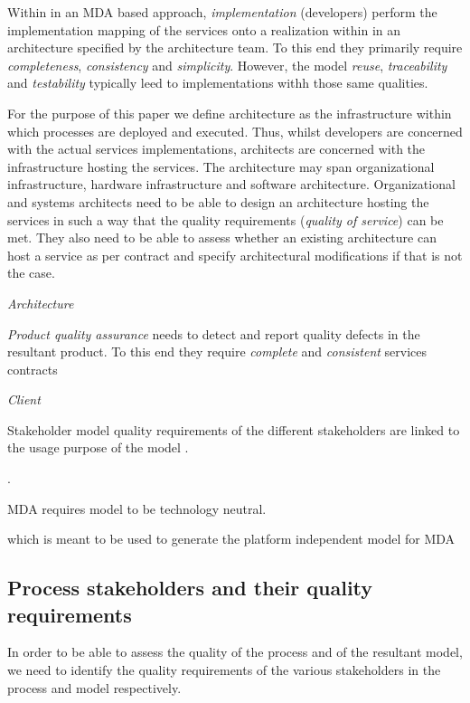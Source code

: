 Within in an MDA based approach, \emph{implementation} (developers) perform the implementation mapping of the services onto a realization within in an architecture specified by the architecture team. To this end they primarily require \emph{completeness}, \emph{consistency} and \emph{simplicity}. However, the  model \emph{reuse}, \emph{traceability} and \emph{testability} typically leed to implementations withh those same qualities.

For the purpose of this paper we define architecture as the infrastructure within which processes are deployed and executed. Thus, whilst developers are concerned with the actual services implementations, architects are concerned with the infrastructure hosting the services. The architecture may span organizational infrastructure, hardware infrastructure and software architecture. Organizational and systems architects need to be able to design an architecture hosting the services in such a way that the quality requirements (\emph{quality of service}) can be met. They also need to be able to assess whether an existing architecture can host a service as per contract and specify architectural modifications if that is not the case. 

\emph{Architecture}

\emph{Product quality assurance} needs to detect and report quality defects in the resultant product. To this end they require \emph{complete} and \emph{consistent} services contracts

\emph{Client}


Stakeholder model quality requirements of the different stakeholders are linked to the usage purpose of the model \cite{lange_christiaan_assessing_2007}. 



\cite{lange_managing_2005,lange_improving_2006}.


MDA requires model to be technology neutral.


which is meant to be used to generate the platform independent model for MDA

\subsection{Process stakeholders and their quality requirements}

In order to be able to assess the quality of the process and of the resultant model, we need to identify the quality requirements of the various stakeholders in the process and model respectively.


